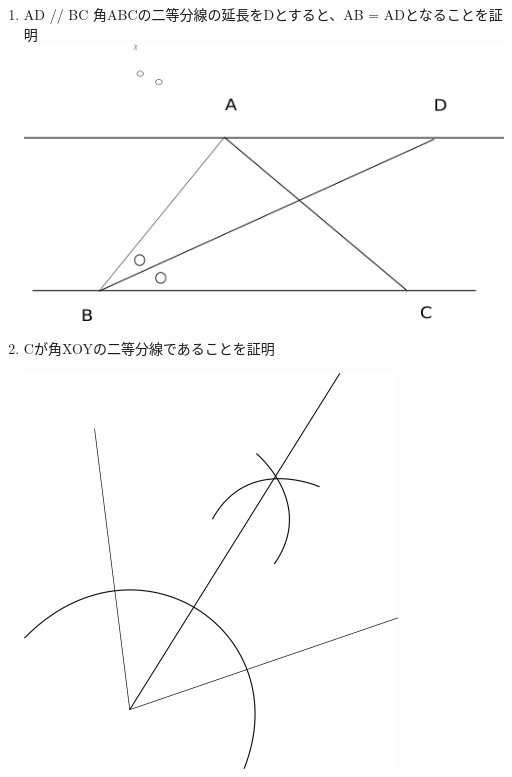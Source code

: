 \documentclass[dvipdfmx]{jsarticle}
\begin{document}
\begin{enumerate}
\begin{enumerate}
      \item AD // BC 角ABCの二等分線の延長をDとすると、AB = ADとなることを証明
        \vspace{0.2in}
        \includegraphics{g4196.png}

        \vspace{2in}
      \item Cが角XOYの二等分線であることを証明

      \includegraphics{g5088.png}
    \end{enumerate}
  \end{enumerate}
\end{document}
